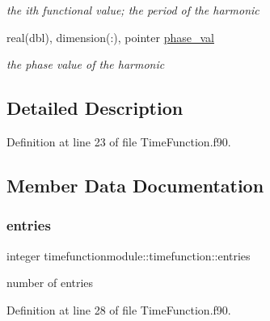\begin{DoxyCompactItemize}
\begin{DoxyCompactList}\small\item\em the ith functional value; the period of the harmonic \end{DoxyCompactList}\item 
real(dbl), dimension(\+:), pointer \hyperlink{structtimefunctionmodule_1_1timefunction_a0f4fd140ac6990ddc82b4129b23cfa08}{phase\+\_\+val}
\begin{DoxyCompactList}\small\item\em the phase value of the harmonic \end{DoxyCompactList}\end{DoxyCompactItemize}


\subsection{Detailed Description}


Definition at line 23 of file Time\+Function.\+f90.



\subsection{Member Data Documentation}
\mbox{\label{structtimefunctionmodule_1_1timefunction_a0f07f62ccbe6c9bcc7d9418b4157b234}} 
\subsubsection{\texorpdfstring{entries}{entries}}
{\footnotesize\ttfamily integer timefunctionmodule\+::timefunction\+::entries\hspace{0.3cm}{\ttfamily [private]}}



number of entries 



Definition at line 28 of file Time\+Function.\+f90.

\mbox{\label{structtimefunctionmodule_1_1timefunction_acd580915b25f29aa47c58467c394d2f4}} 
